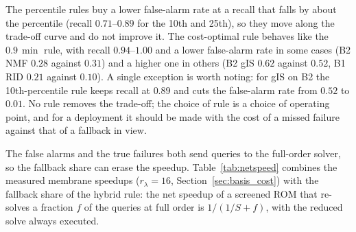 \documentclass[11pt,a4paper]{article}
\begin{document}
\begin{table}[htbp]
\centering
\small
\caption{Recall / false-alarm rate on the test sets for five calibration rules with Eq.~\eqref{eq:eta-adm}, 40 validation queries, eight seeds, five dual dimensions pooled. Parentheses: share of entries for which the rule is undefined (no validation silent failure), which are excluded from recall and false-alarm rate. The percentile rules give recall close to $1 - q$ by construction.}
\label{tab:rules}

\end{table}

The percentile rules buy a lower false-alarm rate at a recall that falls by about the percentile (recall $0.71$--$0.89$ for the 10th and 25th), so they move along the trade-off curve and do not improve it. The cost-optimal rule behaves like the $0.9\,\min$ rule, with recall $0.94$--$1.00$ and a lower false-alarm rate in some cases (B2 NMF $0.28$ against $0.31$) and a higher one in others (B2 gIS $0.62$ against $0.52$, B1 RID $0.21$ against $0.10$). A single exception is worth noting: for gIS on B2 the 10th-percentile rule keeps recall at $0.89$ and cuts the false-alarm rate from $0.52$ to $0.01$. No rule removes the trade-off; the choice of rule is a choice of operating point, and for a deployment it should be made with the cost of a missed failure against that of a fallback in view.

The false alarms and the true failures both send queries to the full-order solver, so the fallback share can erase the speedup. Table~\ref{tab:netspeed} combines the measured membrane speedups ($r_\lambda = 16$, Section~\ref{sec:basis_cost}) with the fallback share of the hybrid rule: the net speedup of a screened ROM that re-solves a fraction $f$ of the queries at full order is $1/(1/S + f)$, with the reduced solve always executed.

\begin{table}[htbp]
\centering
\small
\caption{Net speedup on the membrane with fallback. $f$: share of test queries flagged by the hybrid rule (40 validation queries, eight seeds, five dual dimensions pooled) and sent to the full-order solver; $S$: measured speedup of the unscreened ROM at $r_\lambda = 16$ (single-run sweep). Net speedup is $1/(1/S + f)$.}
\label{tab:netspeed}

\end{table}
\end{document}
